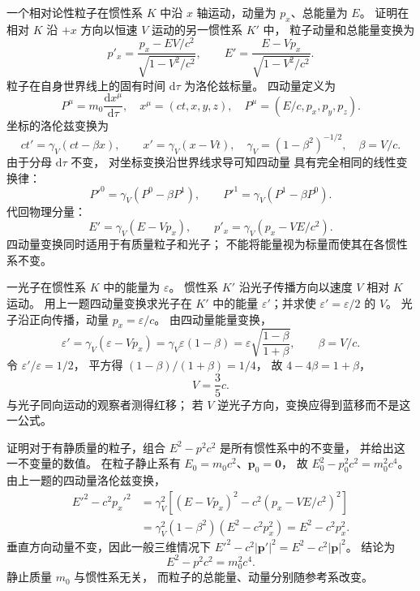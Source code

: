 一个相对论性粒子在惯性系 $K$ 中沿
$x$ 轴运动，动量为 $p_x$、总能量为 $E$。
证明在相对 $K$ 沿 $+x$ 方向以恒速 $V$
运动的另一惯性系 $K'$ 中，
粒子动量和总能量变换为
\[
p'_x=\frac{p_x-EV/c^2}{\sqrt{1-V^2/c^2}},
\qquad
E'=\frac{E-Vp_x}{\sqrt{1-V^2/c^2}}.
\]
\exsolution
粒子在自身世界线上的固有时间
$\mathrm d\tau$ 为洛伦兹标量。
四动量定义为
\[
P^\mu=m_0\frac{\mathrm dx^\mu}{\mathrm d\tau},
\quad
x^\mu=(ct,x,y,z),
\quad
P^\mu=(E/c,p_x,p_y,p_z).
\]
坐标的洛伦兹变换为
\[
ct'=\gamma_V(ct-\beta x),\qquad
x'=\gamma_V(x-Vt),
\quad
\gamma_V=(1-\beta^2)^{-1/2},\quad\beta=V/c.
\]
由于分母 $\mathrm d\tau$ 不变，
对坐标变换沿世界线求导可知四动量
具有完全相同的线性变换律：
\[
P'^0=\gamma_V(P^0-\beta P^1),\qquad
P'^1=\gamma_V(P^1-\beta P^0).
\]
代回物理分量：
\[
\boxed{E'=\gamma_V(E-Vp_x)},\qquad
\boxed{p'_x=\gamma_V(p_x-VE/c^2)}.
\]
\excheck 四动量变换同时适用于有质量粒子和光子；
不能将能量视为标量而使其在各惯性系不变。

一光子在惯性系 $K$ 中的能量为
$\varepsilon$。
惯性系 $K'$ 沿光子传播方向以速度 $V$
相对 $K$ 运动。
用上一题四动量变换求光子在 $K'$ 中的能量
$\varepsilon'$；并求使
$\varepsilon'=\varepsilon/2$ 的 $V$。
\exsolution
光子沿正向传播，动量
$p_x=\varepsilon/c$。
由四动量能量变换，
\[
\varepsilon'=\gamma_V(\varepsilon-Vp_x)
=\gamma_V\varepsilon(1-\beta)
=\boxed{\varepsilon\sqrt{\frac{1-\beta}{1+\beta}}},
\qquad \beta=V/c.
\]
令 $\varepsilon'/\varepsilon=1/2$，
平方得
$(1-\beta)/(1+\beta)=1/4$，
故 $4-4\beta=1+\beta$，
\[
\boxed{V=\frac35c}.
\]
\excheck 与光子同向运动的观察者测得红移；
若 $V$ 逆光子方向，变换应得到蓝移而不是这一公式。

证明对于有静质量的粒子，组合
$E^2-p^2c^2$ 是所有惯性系中的不变量，
并给出这一不变量的数值。
\exsolution
在粒子静止系有
$E_0=m_0c^2$、$\bm p_0=\bm0$，
故
$E_0^2-p_0^2c^2=m_0^2c^4$。
由上一题的四动量洛伦兹变换，
\[
\begin{aligned}
E'^2-c^2p_x'^2
&=\gamma_V^2[(E-Vp_x)^2-
c^2(p_x-VE/c^2)^2]\\
&=\gamma_V^2(1-\beta^2)(E^2-c^2p_x^2)
=E^2-c^2p_x^2.
\end{aligned}
\]
垂直方向动量不变，因此一般三维情况下
$E'^2-c^2|\bm p'|^2=E^2-c^2|\bm p|^2$。
结论为
\[
\boxed{E^2-p^2c^2=m_0^2c^4}.
\]
\excheck 静止质量 $m_0$ 与惯性系无关，
而粒子的总能量、动量分别随参考系改变。


